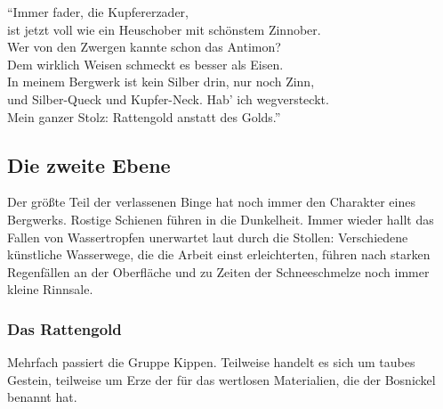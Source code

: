 
\enquote{Immer fader, die Kupfererzader,\\
ist jetzt voll wie ein Heuschober mit schönstem Zinnober.\\
Wer von den Zwergen kannte schon das Antimon?\\
Dem wirklich Weisen schmeckt es besser als Eisen.\\
In meinem Bergwerk ist kein Silber drin, nur noch Zinn,\\
und Silber-Queck und Kupfer-Neck. Hab' ich wegversteckt.\\
Mein ganzer Stolz: Rattengold anstatt des Golds.}





\subsection{Die zweite Ebene}
Der größte Teil der verlassenen Binge hat noch immer den Charakter eines Bergwerks.
Rostige Schienen führen in die Dunkelheit.
Immer wieder hallt das Fallen von Wassertropfen unerwartet laut durch die Stollen:
Verschiedene künstliche Wasserwege, die die Arbeit einst erleichterten, führen nach starken Regenfällen an der Oberfläche und zu Zeiten der Schneeschmelze noch immer kleine Rinnsale.

\subsubsection{Das Rattengold}
Mehrfach passiert die Gruppe Kippen. Teilweise handelt es sich um taubes Gestein, teilweise um Erze der für das \fkv wertlosen Materialien, die der Bosnickel benannt hat.

